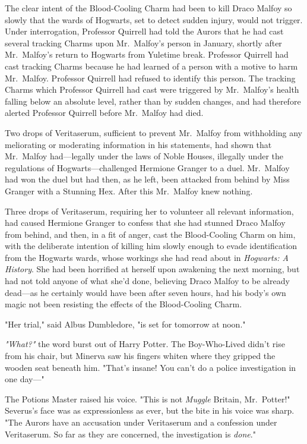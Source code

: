 The clear intent of the Blood-Cooling Charm had been to kill Draco Malfoy so
slowly that the wards of Hogwarts, set to detect sudden injury, would not
trigger. Under interrogation, Professor Quirrell had told the Aurors that he
had cast several tracking Charms upon Mr.~Malfoy's person in January, shortly
after Mr.~Malfoy's return to Hogwarts from Yuletime break. Professor Quirrell
had cast tracking Charms because he had learned of a person with a motive to
harm Mr.~Malfoy. Professor Quirrell had refused to identify this person. The
tracking Charms which Professor Quirrell had cast were triggered by
Mr.~Malfoy's health falling below an absolute level, rather than by sudden
changes, and had therefore alerted Professor Quirrell before Mr.~Malfoy had
died.

Two drops of Veritaserum, sufficient to prevent Mr.~Malfoy from withholding any
meliorating or moderating information in his statements, had shown that
Mr.~Malfoy had---legally under the laws of Noble Houses, illegally under the
regulations of Hogwarts---challenged Hermione Granger to a duel. Mr.~Malfoy had
won the duel but had then, as he left, been attacked from behind by Miss
Granger with a Stunning Hex. After this Mr.~Malfoy knew nothing.

Three drops of Veritaserum, requiring her to volunteer all relevant
information, had caused Hermione Granger to confess that she had stunned Draco
Malfoy from behind, and then, in a fit of anger, cast the Blood-Cooling Charm
on him, with the deliberate intention of killing him slowly enough to evade
identification from the Hogwarts wards, whose workings she had read about in
\emph{Hogwarts: A History}. She had been horrified at herself upon awakening
the next morning, but had not told anyone of what she'd done, believing Draco
Malfoy to be already dead---as he certainly would have been after seven hours,
had his body's own magic not been resisting the effects of the Blood-Cooling
Charm.

"Her trial," said Albus Dumbledore, "is set for tomorrow at noon."

\emph{"What?"} the word burst out of Harry Potter. The Boy-Who-Lived didn't
rise from his chair, but Minerva saw his fingers whiten where they gripped the
wooden seat beneath him. "That's insane! You can't do a police investigation in
one day\mbox{---}"

The Potions Master raised his voice. "This is not \emph{Muggle} Britain,
Mr.~Potter!" Severus's face was as expressionless as ever, but the bite in his
voice was sharp. "The Aurors have an accusation under Veritaserum and a
confession under Veritaserum. So far as they are concerned, the investigation
is \emph{done}."

